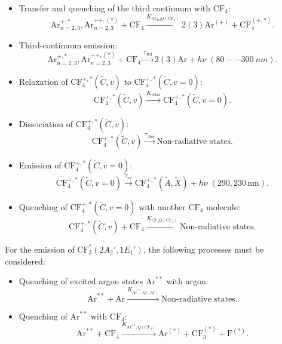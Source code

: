 \documentclass[12pt,a4paper]{article}
\newcommand{\Ar}{\mathrm{Ar}}
\newcommand{\CF}{\mathrm{CF}}
\newcommand{\third}{\mathrm{3rd}}
\begin{document}
\begin{itemize}
    \item Transfer and quenching of the third continuum with $\CF_4$:
    \begin{equation}
        \Ar_{n=2,3}^{+,*},
        \Ar_{n=2,3}^{++,(*)} + \CF_4
        \xrightarrow{K_{\Ar_\third Q(\CF_4)}}  2(3) \Ar^{(+)} + \CF_4^{(+,*)}.
    \end{equation}
    \item Third-continuum emission:
    \begin{equation}
        \Ar_{n=2,3}^{+,*},
        \Ar_{n=2,3}^{++,(*)} + \CF_4
        \xrightarrow{\tau_\third} 2(3) \Ar + h \nu \;(80--\SI{300}{nm}).
    \end{equation}
    \item Relaxation of $\CF_4^{+,*}(\tilde{C},v)$ to $\CF_4^{+,*}(\tilde{C},v=0)$:
    \begin{equation}
         \CF_4^{+,*}(\tilde{C},v) \xrightarrow{K_{\mathrm{relax}}}  \CF_4^{+,*}(\tilde{C},v=0).
    \end{equation}
    \item Dissociation of $\CF_4^{+,*}(\tilde{C},v)$:
    \begin{equation}
         \CF_4^{+,*}(\tilde{C},v) \xrightarrow{\tau_{\mathrm{diss}}} \text{Non-radiative states}.
    \end{equation}
    \item Emission of $\CF_4^{+,*}(\tilde{C},v=0)$:
    \begin{equation}
         \CF_4^{+,*}(\tilde{C},v=0) \xrightarrow{\tau_{\mathrm{uv}}}
         \CF_4^{+,*}(\tilde{A},\tilde{X}) + h \nu \;(290,230\,\mathrm{nm}).
    \end{equation}
    \item Quenching of $\CF_4^{+,*}(\tilde{C},v=0)$ with another $\CF_4$ molecule:
    \begin{equation}
         \CF_4^{+,*}(\tilde{C},v) + \CF_4 \xrightarrow{K_{\CF_4 Q(\CF_4)}} \text{Non-radiative states}.
    \end{equation}
\end{itemize}

For the emission of $\CF_3^*(2A_2',1E_1')$, the following processes must be considered:

\begin{itemize}
    \item Quenching of excited argon states $\Ar^{**}$ with argon:
    \begin{equation}
         \Ar^{**} + \Ar \xrightarrow{K_{\Ar^{**},Q(\Ar)}}  \text{Non-radiative states}.
    \end{equation}
    \item Quenching of $\Ar^{**}$ with $\CF_4$:
    \begin{equation}
         \Ar^{**} + \CF_4 \xrightarrow{K_{\Ar^{**},Q(\CF_4)}}  \Ar^{(*)} + \CF_3^{(*)} + \mathrm{F}^{(*)}.
    \end{equation}
\end{itemize}
\end{document}
